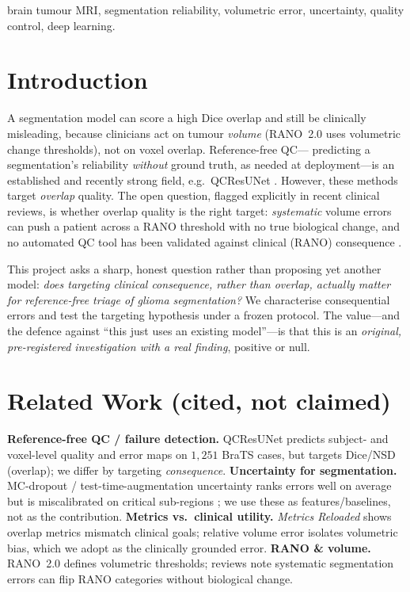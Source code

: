 \documentclass[conference]{IEEEtran}
\begin{document}
\begin{IEEEkeywords}
brain tumour MRI, segmentation reliability, volumetric error, uncertainty,
quality control, deep learning.
\end{IEEEkeywords}

\section{Introduction}
A segmentation model can score a high Dice overlap and still be clinically
misleading, because clinicians act on tumour \emph{volume} (RANO~2.0 uses
volumetric change thresholds), not on voxel overlap. Reference-free QC---%
predicting a segmentation's reliability \emph{without} ground truth, as needed
at deployment---is an established and recently strong field, e.g.\ QCResUNet
\cite{qcresunet}. However, these methods target \emph{overlap} quality. The open
question, flagged explicitly in recent clinical reviews, is whether overlap
quality is the right target: \emph{systematic} volume errors can push a patient
across a RANO threshold with no true biological change, and no automated QC tool
has been validated against clinical (RANO) consequence \cite{rano2,fneur}.

This project asks a sharp, honest question rather than proposing yet another
model: \emph{does targeting clinical consequence, rather than overlap, actually
matter for reference-free triage of glioma segmentation?} We characterise
consequential errors and test the targeting hypothesis under a frozen protocol.
The value---and the defence against ``this just uses an existing model''---is
that this is an \emph{original, pre-registered investigation with a real
finding}, positive or null.

\section{Related Work (cited, not claimed)}
\textbf{Reference-free QC / failure detection.} QCResUNet \cite{qcresunet}
predicts subject- and voxel-level quality and error maps on $1{,}251$ BraTS
cases, but targets Dice/NSD (overlap); we differ by targeting \emph{consequence}.
\textbf{Uncertainty for segmentation.} MC-dropout / test-time-augmentation
uncertainty ranks errors well on average but is miscalibrated on critical
sub-regions \cite{confidence}; we use these as features/baselines, not as the
contribution. \textbf{Metrics vs.\ clinical utility.} \emph{Metrics Reloaded}
\cite{metrics} shows overlap metrics mismatch clinical goals; relative volume
error isolates volumetric bias, which we adopt as the clinically grounded error.
\textbf{RANO \& volume.} RANO~2.0 \cite{rano2} defines volumetric thresholds;
reviews \cite{fneur} note systematic segmentation errors can flip RANO
categories without biological change.
\end{document}
